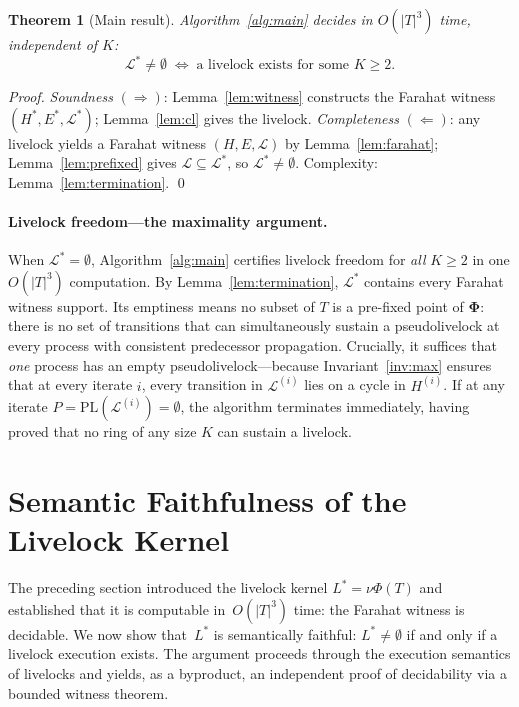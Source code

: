 \documentclass{article}
\newtheorem{theorem}{Theorem}
\newcommand{\Ls}{\mathcal{L}^{*}}
\newcommand{\Li}[1]{\mathcal{L}^{(#1)}}   %
\newcommand{\Hi}[1]{H^{(#1)}}             %
\newcommand{\PL}{\mathrm{PL}}
\newcommand{\bPhi}{\boldsymbol{\Phi}}
\newcommand{\Hstar}{H^{*}}
\newcommand{\Estar}{E^{*}}
\newcommand{\Lstar}{L^{*}}
\begin{document}
\begin{theorem}[Main result]
\label{thm:main}
Algorithm~\ref{alg:main} decides in $O(|T|^3)$ time, independent of $K$:
\[
  \Ls \neq \emptyset
  \;\iff\;
  \text{a livelock exists for some } K \geq 2.
\]
\end{theorem}

\begin{proof}
\emph{Soundness} $(\Rightarrow)$: Lemma~\ref{lem:witness} constructs the
Farahat witness $(\Hstar,\Estar,\Ls)$; Lemma~\ref{lem:cl} gives the
livelock.
\emph{Completeness} $(\Leftarrow)$: any livelock yields a Farahat witness
$(H,E,\mathcal{L})$ by Lemma~\ref{lem:farahat}; Lemma~\ref{lem:prefixed}
gives $\mathcal{L}\subseteq\Ls$, so $\Ls\neq\emptyset$.
Complexity: Lemma~\ref{lem:termination}. \qed
\end{proof}

\paragraph{Livelock freedom---the maximality argument.}
When $\Ls=\emptyset$, Algorithm~\ref{alg:main} certifies livelock
freedom for \emph{all} $K\!\geq\!2$ in one $O(|T|^3)$ computation.
By Lemma~\ref{lem:termination}, $\Ls$ contains every Farahat witness support.
Its emptiness means no subset of $T$ is a pre-fixed point of $\bPhi$:
there is no set of transitions that can simultaneously sustain a
pseudolivelock at every process with consistent predecessor propagation.
Crucially, it suffices that \emph{one} process has an empty
pseudolivelock---because Invariant~\ref{inv:max} ensures that at every
iterate $i$, every transition in $\Li{i}$ lies on a cycle in $\Hi{i}$.
If at any iterate $P=\PL(\Li{i})=\emptyset$, the algorithm terminates
immediately, having proved that no ring of any size $K$ can sustain a
livelock.

\section{Semantic Faithfulness of the Livelock Kernel}
The preceding section introduced the livelock kernel
$\Lstar = \nu\Phi(T)$ and established that it is computable
in~$O(|T|^3)$ time: the Farahat witness is decidable.
We now show that~$\Lstar$ is semantically faithful:
$\Lstar \neq \emptyset$ if and only if a livelock execution
exists.
The argument proceeds through the execution semantics of
livelocks and yields, as a byproduct, an independent proof
of decidability via a bounded witness theorem.
\end{document}
